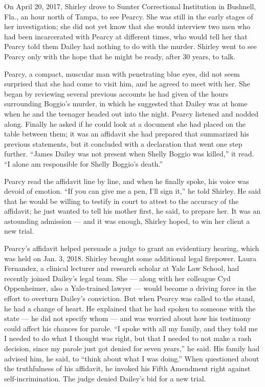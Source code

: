 On April 20, 2017, Shirley drove to Sumter Correctional Institution in
Bushnell, Fla., an hour north of Tampa, to see Pearcy. She was still in
the early stages of her investigation; she did not yet know that she
would interview two men who had been incarcerated with Pearcy at
different times, who would tell her that Pearcy told them Dailey had
nothing to do with the murder. Shirley went to see Pearcy only with the
hope that he might be ready, after 30 years, to talk.

Pearcy, a compact, muscular man with penetrating blue eyes, did not seem
surprised that she had come to visit him, and he agreed to meet with
her. She began by reviewing several previous accounts he had given of
the hours surrounding Boggio's murder, in which he suggested that Dailey
was at home when he and the teenager headed out into the night. Pearcy
listened and nodded along. Finally he asked if he could look at a
document she had placed on the table between them; it was an affidavit
she had prepared that summarized his previous statements, but it
concluded with a declaration that went one step further. ``James Dailey
was not present when Shelly Boggio was killed,'' it read. ``I alone am
responsible for Shelly Boggio's death.''

Pearcy read the affidavit line by line, and when he finally spoke, his
voice was devoid of emotion. ``If you can give me a pen, I'll sign it,''
he told Shirley. He said that he would be willing to testify in court to
attest to the accuracy of the affidavit; he just wanted to tell his
mother first, he said, to prepare her. It was an astounding admission
--- and it was enough, Shirley hoped, to win her client a new trial.

Pearcy's affidavit helped persuade a judge to grant an evidentiary
hearing, which was held on Jan. 3, 2018. Shirley brought some additional
legal firepower. Laura Fernandez, a clinical lecturer and research
scholar at Yale Law School, had recently joined Dailey's legal team. She
--- along with her colleague Cyd Oppenheimer, also a Yale-trained lawyer
--- would become a driving force in the effort to overturn Dailey's
conviction. But when Pearcy was called to the stand, he had a change of
heart. He explained that he had spoken to someone with the state --- he
did not specify whom --- and was worried about how his testimony could
affect his chances for parole. ``I spoke with all my family, and they
told me I needed to do what I thought was right, but that I needed to
not make a rash decision, since my parole just got denied for seven
years,'' he said. His family had advised him, he said, to ``think about
what I was doing.'' When questioned about the truthfulness of his
affidavit, he invoked his Fifth Amendment right against
self-incrimination. The judge denied Dailey's bid for a new trial.

